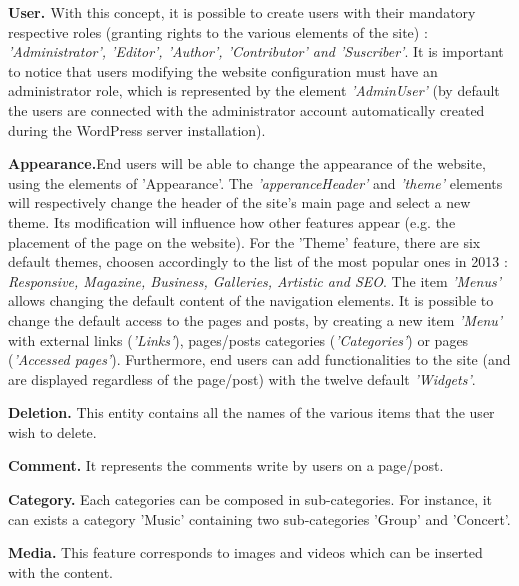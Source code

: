 \vspace{0.15em}
\noindent\textbf{User. \label{userElement}} With this concept, it is possible to create users with their mandatory respective roles (granting rights to the various elements of the site) : \textit{'Administrator', 'Editor', 'Author', 'Contributor' and 'Suscriber'}. It is important to notice that users modifying the website configuration  must have an administrator role, which is represented by the element \textit{'AdminUser'} (by default the users are connected with the administrator account automatically created during the WordPress server installation).
 
\vspace{0.15em}
\noindent\textbf{Appearance.}End users will be able to change the appearance of the website, using the elements of 'Appearance'. The \textit{'apperanceHeader'} and \textit{'theme'} elements will respectively change the header of the site's main page and select a new theme. Its modification will influence how other features appear (e.g. the placement of the page on the website). For the 'Theme' feature, there are six default themes, choosen accordingly to the list of the most popular ones in 2013 \cite{topTheme} : \textit{Responsive, Magazine, Business, Galleries, Artistic and SEO}. 
The item \textit{'Menus'\label{menu}} allows changing the default content of the navigation elements. It is possible to change the default  access to the pages and posts, by creating a new item \textit{'Menu'} with external links (\textit{'Links'}), pages/posts categories (\textit{'Categories'}) or pages (\textit{'Accessed pages'}). 
Furthermore, end users can add functionalities to the site (and are displayed regardless of the page/post) with the twelve default \textit{'Widgets'}.

\vspace{0.15em}
\noindent\textbf{Deletion.} This entity contains all the names of the various items that the user wish to delete.

\vspace{0.15em}
\noindent\textbf{Comment.} It represents the comments write by users on a page/post.

\vspace{0.15em}
\noindent\textbf{Category.} Each categories can be composed in sub-categories. For instance, it can exists a category 'Music' containing two sub-categories 'Group' and 'Concert'.

\vspace{0.15em}
\noindent\textbf{Media.} This feature corresponds to images and videos which can be inserted with the content.

